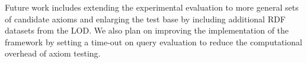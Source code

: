 \documentclass{llncs}
\begin{document}
Future work includes extending the experimental evaluation to more general sets
of candidate axioms and enlarging the test base by including additional RDF datasets
from the LOD.
We also plan on improving the implementation of the framework by setting a time-out
on query evaluation to reduce the computational overhead of axiom testing.



\end{document}
